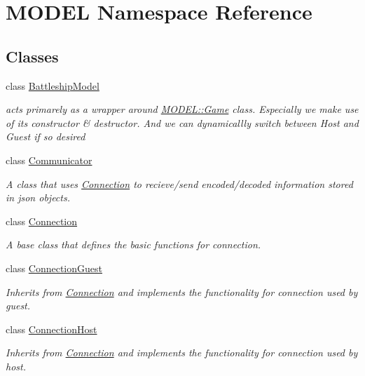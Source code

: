 \hypertarget{namespaceMODEL}{}\section{M\+O\+D\+EL Namespace Reference}
\label{namespaceMODEL}
\subsection*{Classes}
\begin{DoxyCompactItemize}
\item 
class \hyperlink{classMODEL_1_1BattleshipModel}{Battleship\+Model}
\begin{DoxyCompactList}\small\item\em acts primarely as a wrapper around \hyperlink{classMODEL_1_1Game}{M\+O\+D\+E\+L\+::\+Game} class. Especially we make use of its constructor \& destructor. And we can dynamicallly switch between Host and Guest if so desired \end{DoxyCompactList}\item 
class \hyperlink{classMODEL_1_1Communicator}{Communicator}
\begin{DoxyCompactList}\small\item\em A class that uses \hyperlink{classMODEL_1_1Connection}{Connection} to recieve/send encoded/decoded information stored in json objects. \end{DoxyCompactList}\item 
class \hyperlink{classMODEL_1_1Connection}{Connection}
\begin{DoxyCompactList}\small\item\em A base class that defines the basic functions for connection. \end{DoxyCompactList}\item 
class \hyperlink{classMODEL_1_1ConnectionGuest}{Connection\+Guest}
\begin{DoxyCompactList}\small\item\em Inherits from \hyperlink{classMODEL_1_1Connection}{Connection} and implements the functionality for connection used by guest. \end{DoxyCompactList}\item 
class \hyperlink{classMODEL_1_1ConnectionHost}{Connection\+Host}
\begin{DoxyCompactList}\small\item\em Inherits from \hyperlink{classMODEL_1_1Connection}{Connection} and implements the functionality for connection used by host. \end{DoxyCompactList}\item 

\end{DoxyCompactItemize}
